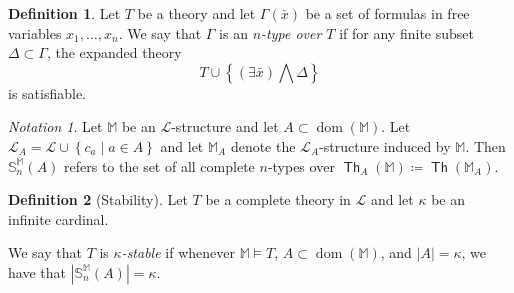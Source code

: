 \documentclass[10pt,letterpaper,cm]{nupset}
\theoremstyle{definition}
\newtheorem{definition}{Definition}
\theoremstyle{theorem}
\theoremstyle{remark}
\newtheorem*{notation}{Notation}
\newcommand{\M}{\mathbb M}
\renewcommand{\L}{\mathcal L}
\renewcommand{\S}{\mathbb S}
\newcommand{\1}{\mathbb{1}}
\newcommand{\0}{\vec 0}
\DeclareMathOperator{\dom}{dom}
\DeclareMathOperator{\thh}{\mathsf{Th}}
\begin{document}
\begin{definition}
Let $T$ be a theory and let $\Gamma(\bar{x})$ be a set of formulas in free variables $x_1, \ldots, x_n$. We say that $\Gamma$ is an \textit{$n$-type over $T$} if for any finite subset $\Delta \subset \Gamma$, the expanded theory $$T\cup \left\{\left(\exists{\bar{x}}\right)\bigwedge{\Delta}\right\}$$ is satisfiable. 
\end{definition}

\begin{notation}
Let $\M$ be an $\L$-structure and let $A\subset \dom(\M)$. Let $\L_A = \L \cup \left\{c_a \mid a \in A\right\}$ and let $\M_A$ denote the  $\L_A$-structure induced by $\M$.  Then  $\S_n^{\M}(A)$ refers to the set of all complete $n$-types over $\thh_A(\M) \coloneqq \thh(\M_A)$.
\end{notation}
\begin{definition}[Stability] Let $T$ be a complete theory in $\L$ and let $\kappa$ be an infinite cardinal.  
\begin{comment}
\begin{enumerate}[label=(\roman*)]
\item Let $p$ be the set of all $\L_A$ formulas in free variables $x_1, \ldots, x_n$. We say that $p$ is \textit{$n$-type} if $p \cup \thh_A(\M)$ is satisfiable.

In this case, we call $p$ \textit{complete} if $\theta \in p$ or $\neg{\theta}$ for any $\L_A$-formula $\theta$ with free variables among $x_1, \ldots, x_n$. 
\item
\end{enumerate}
\end{comment}
We say that $T$ is \textit{$\kappa$-stable} if whenever $\M \models T$, $A\subset \dom(\M)$, and $\left\lvert{A}\right\rvert = \kappa$, we have that $\left\lvert{\S_n^{\M}(A)}\right\rvert = \kappa$.
\end{definition} 
\end{document}
